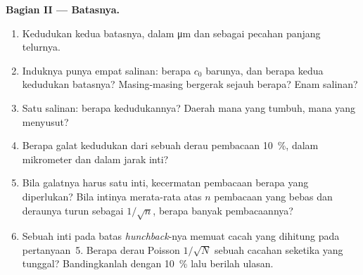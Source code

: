 \begin{problem}
\medskip
\noindent\textbf{Bagian II --- Batasnya.}
\begin{enumerate}[resume]
  \item Kedudukan kedua batasnya, dalam \unit{\micro m} dan sebagai
        pecahan panjang telurnya.
  \item Induknya punya empat salinan: berapa $c_{0}$ barunya, dan berapa kedua kedudukan
        batasnya? Masing-masing bergerak sejauh berapa? Enam salinan?
  \item Satu salinan: berapa kedudukannya? Daerah mana yang tumbuh, mana yang menyusut?
  \item Berapa galat kedudukan dari sebuah derau pembacaan \qty{10}{\%}, dalam
        mikrometer dan dalam jarak inti?
  \item Bila galatnya harus satu inti, kecermatan pembacaan berapa yang
        diperlukan? Bila intinya merata-rata atas $n$ pembacaan yang bebas
        dan deraunya turun sebagai $1/\sqrt{n}$, berapa banyak pembacaannya?
  \item Sebuah inti pada batas \emph{hunchback}-nya memuat cacah
        yang dihitung pada pertanyaan~5. Berapa derau Poisson
        $1/\sqrt{N}$ sebuah cacahan seketika yang tunggal? Bandingkanlah dengan
        \qty{10}{\%} lalu berilah ulasan.
\end{enumerate}


\end{problem}

